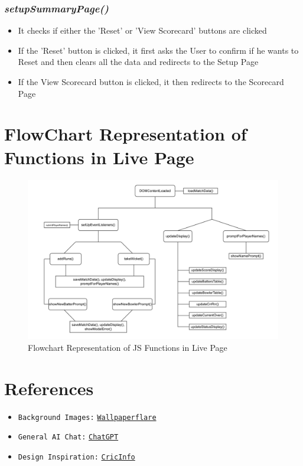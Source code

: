 \documentclass[a4paper,12pt]{article}
\begin{document}
\subsubsection{\textit{setupSummaryPage()}}
\begin{itemize}
\item It checks if either the 'Reset' or 'View Scorecard' buttons are clicked
\item If the 'Reset' button is clicked, it first asks the User to confirm if he wants to Reset and then clears all the data and redirects to the Setup Page 
\item If the View Scorecard button is clicked, it then redirects to the Scorecard Page
\end{itemize} 

\clearpage

\section{FlowChart Representation of Functions in Live Page}
\begin{figure}[h!]
\centering
\includegraphics[width=\textwidth]{images/flowchart.png}
\caption{Flowchart Representation of JS Functions in Live Page} 
\label{flowchart}
\end{figure}

\section{References}
\begin{itemize}
  \item \texttt{Background Images:} \href{www.wallpaperflare.com}{\texttt{Wallpaperflare}}
  \item \texttt{General AI Chat:} \href{https://chatgpt.com/share/6810c68c-5d30-800b-84c0-c59a2974420f}{\texttt{ChatGPT}}
  \item \texttt{Design Inspiration:} \href{https://www.espncricinfo.com/}{\texttt{CricInfo}} 
\end{itemize}
\end{document}
